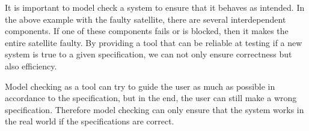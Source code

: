 It is important to model check a system to ensure that it behaves as intended.
In the above example with the faulty satellite, there are several interdependent components.
If one of these components fails or is blocked, then it makes the entire satellite faulty.
By providing a tool that can be reliable at testing if a new system is true to a given specification, we can not only ensure correctness but also efficiency.


Model checking as a tool can try to guide the user as much as possible in accordance to the specification, but in the end, the user can still make a wrong specification. Therefore model checking can only ensure that the system works in the real world if the specifications are correct.





